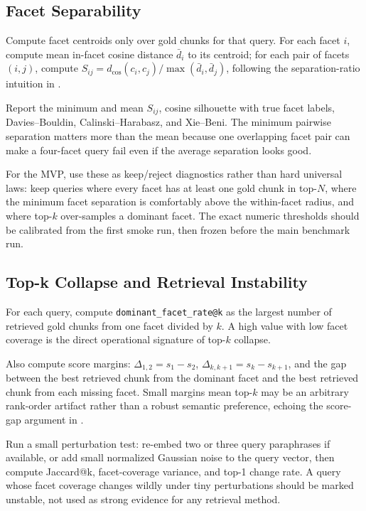 \documentclass[11pt,a4paper]{article}
\newcommand{\field}[1]{\texttt{#1}}
\begin{document}
\subsection{Facet Separability}

Compute facet centroids only over gold chunks for that query. For each facet $i$, compute mean in-facet cosine distance $\bar{d}_i$ to its centroid; for each pair of facets $(i,j)$, compute $S_{ij}=d_{\cos}(c_i,c_j)/\max(\bar{d}_i,\bar{d}_j)$, following the separation-ratio intuition in \citet{pavonIntrinsicThematicSeparability2026}.

Report the minimum and mean $S_{ij}$, cosine silhouette with true facet labels, Davies--Bouldin, Calinski--Harabasz, and Xie--Beni. The minimum pairwise separation matters more than the mean because one overlapping facet pair can make a four-facet query fail even if the average separation looks good.

For the MVP, use these as keep/reject diagnostics rather than hard universal laws: keep queries where every facet has at least one gold chunk in top-$N$, where the minimum facet separation is comfortably above the within-facet radius, and where top-$k$ over-samples a dominant facet. The exact numeric thresholds should be calibrated from the first smoke run, then frozen before the main benchmark run.

\subsection{Top-k Collapse and Retrieval Instability}

For each query, compute \field{dominant\_facet\_rate@k} as the largest number of retrieved gold chunks from one facet divided by $k$. A high value with low facet coverage is the direct operational signature of top-$k$ collapse.

Also compute score margins: $\Delta_{1,2}=s_1-s_2$, $\Delta_{k,k+1}=s_k-s_{k+1}$, and the gap between the best retrieved chunk from the dominant facet and the best retrieved chunk from each missing facet. Small margins mean top-$k$ may be an arbitrary rank-order artifact rather than a robust semantic preference, echoing the score-gap argument in \citet{lopezfuneHighDimensionalConcentrationRetrieval2026}.

Run a small perturbation test: re-embed two or three query paraphrases if available, or add small normalized Gaussian noise to the query vector, then compute Jaccard@k, facet-coverage variance, and top-1 change rate. A query whose facet coverage changes wildly under tiny perturbations should be marked unstable, not used as strong evidence for any retrieval method.
\end{document}
